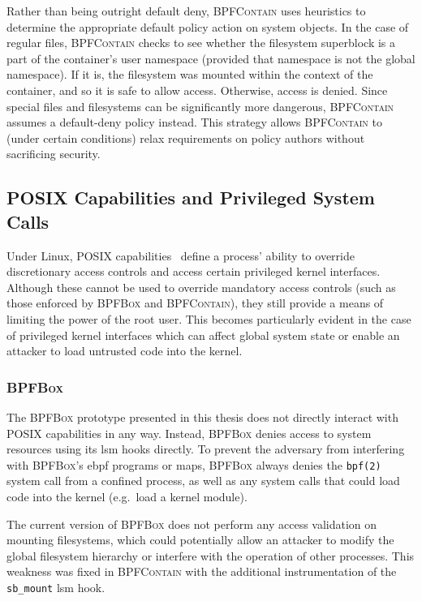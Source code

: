 \documentclass[
  fontsize=12pt,
  titlepage=firstiscover,
  paper=letter,
oneside,
  cleardoublepage=plain,
  parskip=half-,
  DIV=10,
  parindent,
  appendixprefix,
  chapterprefix,
  listof=totoc,
]{scrbook}
\newcommand{\bpfbox}{\textsc{BPFBox}}
\newcommand{\bpfcontain}{\textsc{BPFContain}}
\begin{document}
Rather than being outright default deny, \bpfcontain{} uses heuristics to determine the
appropriate default policy action on system objects. In the case of regular files,
\bpfcontain{} checks to see whether the filesystem superblock is a part of the container's
user namespace (provided that namespace is not the global namespace). If it is, the
filesystem was mounted within the context of the container, and so it is safe to allow
access. Otherwise, access is denied. Since special files and filesystems can be
significantly more dangerous, \bpfcontain{} assumes a default-deny policy instead. This
strategy allows \bpfcontain{} to (under certain conditions) relax requirements on policy
authors without sacrificing security.

\subsection{POSIX Capabilities and Privileged System Calls}

Under Linux, POSIX capabilities~\cite{posix_capabilities} define a process' ability to
override discretionary access controls and access certain privileged kernel interfaces.
Although these cannot be used to override mandatory access controls (such as those
enforced by \bpfbox{} and \bpfcontain{}), they still provide a means of limiting the power
of the root user. This becomes particularly evident in the case of privileged kernel
interfaces which can affect global system state or enable an attacker to load untrusted
code into the kernel.

\subsubsection{\bpfbox{}}

The \bpfbox{} prototype presented in this thesis does not directly interact with POSIX
capabilities in any way. Instead, \bpfbox{} denies access to system resources using its
\gls{lsm} hooks directly. To prevent the adversary from interfering with \bpfbox{}'s
\gls{ebpf} programs or maps, \bpfbox{} always denies the \texttt{bpf(2)} system call from
a confined process, as well as any system calls that could load code into the kernel
(e.g.\ load a kernel module).

The current version of \bpfbox{} does not perform any access validation on mounting
filesystems, which could potentially allow an attacker to modify the global filesystem
hierarchy or interfere with the operation of other processes. This weakness was fixed in
\bpfcontain{} with the additional instrumentation of the \texttt{sb\_mount} \gls{lsm}
hook.
\end{document}

